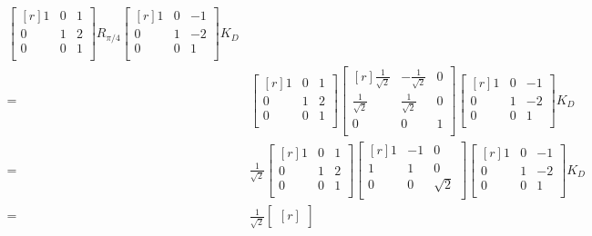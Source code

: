 \documentclass[../main.tex]{subfiles}
\begin{document}
\begin{enumerate}[a)]
\begin{align*}
\begin{bmatrix*}[r]
				1 & 0 & 1 \\
				0 & 1 & 2 \\
				0 & 0 & 1 \\
			\end{bmatrix*}
			R_{\pi/4}
			\begin{bmatrix*}[r]
				1 & 0 & -1 \\
				0 & 1 & -2 \\
				0 & 0 & 1 \\
			\end{bmatrix*}
			K_D
			\\=&
			\begin{bmatrix*}[r]
				1 & 0 & 1 \\
				0 & 1 & 2 \\
				0 & 0 & 1 \\
			\end{bmatrix*}
			\begin{bmatrix*}[r]
				\frac{1}{\sqrt{2}} & -\frac{1}{\sqrt{2}} & 0 \\
				\frac{1}{\sqrt{2}} & \frac{1}{\sqrt{2}} & 0 \\
				0 & 0 & 1 \\
			\end{bmatrix*}
			\begin{bmatrix*}[r]
				1 & 0 & -1 \\
				0 & 1 & -2 \\
				0 & 0 & 1 \\
			\end{bmatrix*}
			K_D
			\\=&
			\frac{1}{\sqrt{2}}
			\begin{bmatrix*}[r]
				1 & 0 & 1 \\
				0 & 1 & 2 \\
				0 & 0 & 1 \\
			\end{bmatrix*}
			\begin{bmatrix*}[r]
				1 & -1 & 0 \\
				1 & 1 & 0 \\
				0 & 0 & \sqrt{2} \\
			\end{bmatrix*}
			\begin{bmatrix*}[r]
				1 & 0 & -1 \\
				0 & 1 & -2 \\
				0 & 0 & 1 \\
			\end{bmatrix*}
			K_D
			\\=&
			\frac{1}{\sqrt{2}}
			\begin{bmatrix*}[r]

\end{bmatrix*}
\end{align*}
\end{enumerate}
\end{document}
